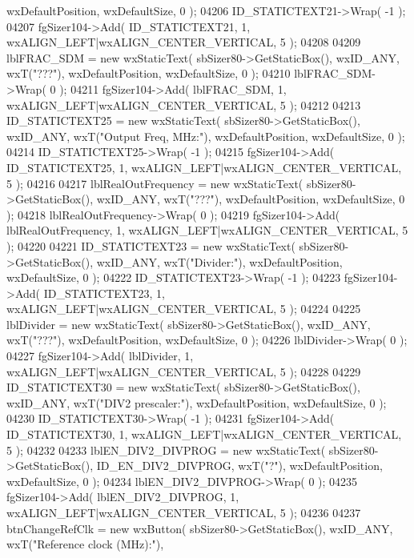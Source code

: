 \begin{DoxyCode}
      wxDefaultPosition, wxDefaultSize, 0 );
04206     ID_STATICTEXT21->Wrap( -1 );
04207     fgSizer104->Add( ID_STATICTEXT21, 1, wxALIGN\_LEFT|wxALIGN\_CENTER\_VERTICAL, 5 );
04208     
04209     lblFRAC_SDM = \textcolor{keyword}{new} wxStaticText( sbSizer80->GetStaticBox(), wxID\_ANY, wxT(\textcolor{stringliteral}{"???"}), wxDefaultPosition, 
      wxDefaultSize, 0 );
04210     lblFRAC_SDM->Wrap( 0 );
04211     fgSizer104->Add( lblFRAC_SDM, 1, wxALIGN\_LEFT|wxALIGN\_CENTER\_VERTICAL, 5 );
04212     
04213     ID_STATICTEXT25 = \textcolor{keyword}{new} wxStaticText( sbSizer80->GetStaticBox(), wxID\_ANY, wxT(\textcolor{stringliteral}{"Output Freq, MHz:"}), 
      wxDefaultPosition, wxDefaultSize, 0 );
04214     ID_STATICTEXT25->Wrap( -1 );
04215     fgSizer104->Add( ID_STATICTEXT25, 1, wxALIGN\_LEFT|wxALIGN\_CENTER\_VERTICAL, 5 );
04216     
04217     lblRealOutFrequency = \textcolor{keyword}{new} wxStaticText( sbSizer80->GetStaticBox(), wxID\_ANY, wxT(\textcolor{stringliteral}{"???"}), 
      wxDefaultPosition, wxDefaultSize, 0 );
04218     lblRealOutFrequency->Wrap( 0 );
04219     fgSizer104->Add( lblRealOutFrequency, 1, wxALIGN\_LEFT|wxALIGN\_CENTER\_VERTICAL, 5 );
04220     
04221     ID_STATICTEXT23 = \textcolor{keyword}{new} wxStaticText( sbSizer80->GetStaticBox(), wxID\_ANY, wxT(\textcolor{stringliteral}{"Divider:"}), 
      wxDefaultPosition, wxDefaultSize, 0 );
04222     ID_STATICTEXT23->Wrap( -1 );
04223     fgSizer104->Add( ID_STATICTEXT23, 1, wxALIGN\_LEFT|wxALIGN\_CENTER\_VERTICAL, 5 );
04224     
04225     lblDivider = \textcolor{keyword}{new} wxStaticText( sbSizer80->GetStaticBox(), wxID\_ANY, wxT(\textcolor{stringliteral}{"???"}), wxDefaultPosition, 
      wxDefaultSize, 0 );
04226     lblDivider->Wrap( 0 );
04227     fgSizer104->Add( lblDivider, 1, wxALIGN\_LEFT|wxALIGN\_CENTER\_VERTICAL, 5 );
04228     
04229     ID_STATICTEXT30 = \textcolor{keyword}{new} wxStaticText( sbSizer80->GetStaticBox(), wxID\_ANY, wxT(\textcolor{stringliteral}{"DIV2 prescaler:"}), 
      wxDefaultPosition, wxDefaultSize, 0 );
04230     ID_STATICTEXT30->Wrap( -1 );
04231     fgSizer104->Add( ID_STATICTEXT30, 1, wxALIGN\_LEFT|wxALIGN\_CENTER\_VERTICAL, 5 );
04232     
04233     lblEN_DIV2_DIVPROG = \textcolor{keyword}{new} wxStaticText( sbSizer80->GetStaticBox(), 
      ID_EN_DIV2_DIVPROG, wxT(\textcolor{stringliteral}{"?"}), wxDefaultPosition, wxDefaultSize, 0 );
04234     lblEN_DIV2_DIVPROG->Wrap( 0 );
04235     fgSizer104->Add( lblEN_DIV2_DIVPROG, 1, wxALIGN\_LEFT|wxALIGN\_CENTER\_VERTICAL, 5 );
04236     
04237     btnChangeRefClk = \textcolor{keyword}{new} wxButton( sbSizer80->GetStaticBox(), wxID\_ANY, wxT(\textcolor{stringliteral}{"Reference clock (MHz):"}), 

\end{DoxyCode}
